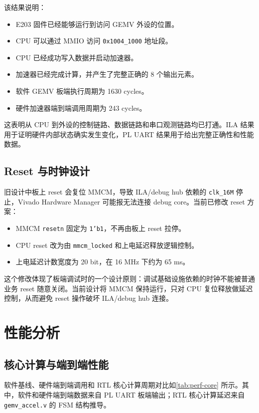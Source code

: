 \documentclass[12pt, a4paper]{article}
\begin{document}
该结果说明：

\begin{itemize}
    \item E203 固件已经能够运行到访问 GEMV 外设的位置。
    \item CPU 可以通过 MMIO 访问 \texttt{0x1004\_1000} 地址段。
    \item CPU 已经成功写入数据并启动加速器。
    \item 加速器已经完成计算，并产生了完整正确的 8 个输出元素。
    \item 软件 GEMV 板端执行周期为 1630 cycles。
    \item 硬件加速器端到端调用周期为 243 cycles。
\end{itemize}

这表明从 CPU 到外设的控制链路、数据链路和串口观测链路均已打通。ILA 结果用于证明硬件内部状态确实发生变化，PL UART 结果用于给出完整正确性和性能数据。

\subsection{Reset 与时钟设计}

旧设计中板上 reset 会复位 MMCM，导致 ILA/debug hub 依赖的 \texttt{clk\_16M} 停止，Vivado Hardware Manager 可能报无法连接 debug core。当前已修改 reset 方案：

\begin{itemize}
    \item MMCM \texttt{resetn} 固定为 \texttt{1'b1}，不再由板上 reset 拉停。
    \item CPU reset 改为由 \texttt{mmcm\_locked} 和上电延迟释放逻辑控制。
    \item 上电延迟计数宽度为 20 bit，在 16 MHz 下约为 65 ms。
\end{itemize}

这个修改体现了板端调试时的一个设计原则：调试基础设施依赖的时钟不能被普通业务 reset 随意关闭。当前设计将 MMCM 保持运行，只对 CPU 复位释放做延迟控制，从而避免 reset 操作破坏 ILA/debug hub 连接。

\section{性能分析}

\subsection{核心计算与端到端性能}

软件基线、硬件端到端调用和 RTL 核心计算周期对比如\cref{tab:perf-core} 所示。其中，软件和硬件端到端数据来自 PL UART 板端输出；RTL 核心计算延迟来自 \texttt{gemv\_accel.v} 的 FSM 结构推导。
\end{document}
